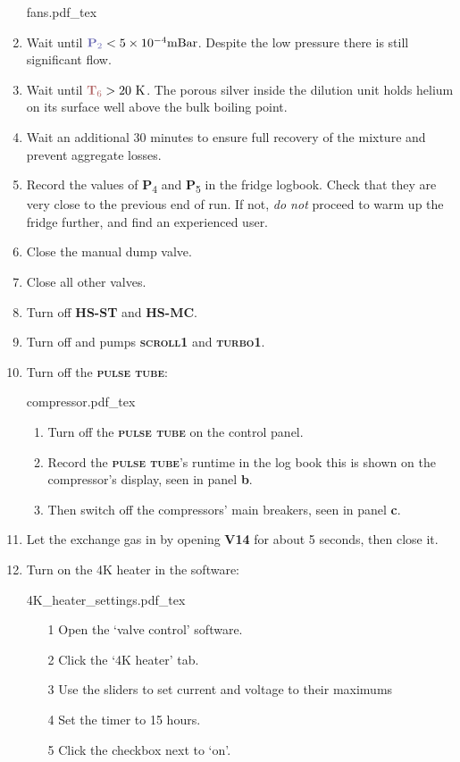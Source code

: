 \documentclass{article}[18pt,A4]
\newcommand{\mBar}{\mathrm{mBar}}
\newcommand{\kelvin}{\mathrm{K}}
\newcommand{\thing}[1]{{\color{gray}\textsc{ \textbf{#1}}}}
\newcommand{\valve}[1]{{\color{gray}\textbf{V#1}}}
\newcommand{\pressure}[1]{{\color{pressurecolor}\textbf{P}\textsubscript{#1}}}
\newcommand{\temperature}[1]{{\color{temperaturecolor}\textbf{T}\textsubscript{#1}}}
\begin{document}
\begin{enumerate}
    {
    \centering
    {fans.pdf_tex}
    }
        
    \item Wait until $\pressure{2} < 5\times10^{-4} \mBar$. Despite the low pressure there is still significant flow. 
    \item Wait until $\temperature{6} > 20~\kelvin$. The porous silver inside the dilution unit holds helium on its surface well above the bulk boiling point. 
    \item Wait an additional 30 minutes to ensure full recovery of the mixture and prevent aggregate losses. 
    \item Record the values of \pressure{4} and \pressure{5} in the fridge logbook.
    Check that they are very close to the previous end of run. 
    If not, \emph{do not} proceed to warm up the fridge further, and find an experienced user.
    \item Close the manual dump valve.
    \item Close all other valves.
    \item Turn off \thing{HS-ST} and \thing{HS-MC}.
    \item Turn off and pumps \thing{scroll1} and \thing{turbo1}. 
    
    \item Turn off the \thing{pulse tube}:
    
    {
    \centering
    {compressor.pdf_tex}
    }
    \begin{enumerate}
    \item Turn off the \thing{pulse tube} on the control panel.
    \item Record the \thing{pulse tube}'s runtime in the log book this is shown on the compressor's display, seen in panel \textbf{b}.
    \item Then switch off the compressors' main breakers, seen in panel \textbf{c}.
    \end{enumerate}
    
    \item Let the exchange gas in by opening \valve{14} for about 5 seconds, then close it. 
    \item Turn on the 4K heater in the software:
    
    {
    \centering
    {4K_heater_settings.pdf_tex}
    }
        \begin{enumerate}
        \item[1] Open the `valve control' software.
        \item[2] Click the `4K heater' tab. 
        \item[3] Use the sliders to set current and voltage to their maximums
        \item[4] Set the timer to 15 hours.
        \item[5] Click the checkbox next to `on'.
        \end{enumerate}
        

\end{enumerate}
\end{document}
